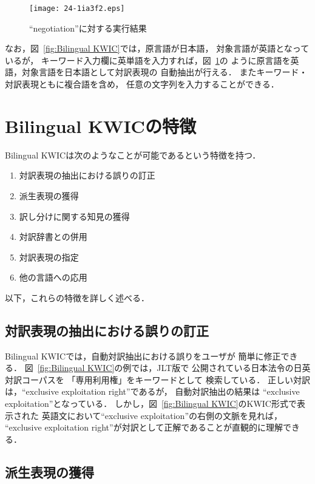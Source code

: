 \documentclass[japanese]{jnlp_1.4}
\begin{document}
\begin{figure}[t]
\begin{center}
\texttt{[image: 24-1ia3f2.eps]}
\end{center}
\caption{``negotiation''に対する実行結果}
\label{fig:Bilingual KWIC 2}
\vspace{-0.5\Cvs}
\end{figure}

なお，図~\ref{fig:Bilingual KWIC}では，原言語が日本語，
対象言語が英語となっているが，
キーワード入力欄に英単語を入力すれば，図~\ref{fig:Bilingual KWIC 2}の
ように原言語を英語，対象言語を日本語として対訳表現の
自動抽出が行える．
またキーワード・対訳表現ともに複合語を含め，
任意の文字列を入力することができる．

\clearpage

\section{Bilingual KWICの特徴}
\label{sec:character}

Bilingual KWICは次のようなことが可能であるという特徴を持つ．
\begin{enumerate}
 \item 対訳表現の抽出における誤りの訂正
 \item 派生表現の獲得
 \item 訳し分けに関する知見の獲得
 \item 対訳辞書との併用
 \item 対訳表現の指定
 \item 他の言語への応用
\end{enumerate}

以下，これらの特徴を詳しく述べる．


\subsection{対訳表現の抽出における誤りの訂正}

Bilingual KWICでは，自動対訳抽出における誤りをユーザが
簡単に修正できる．
図~\ref{fig:Bilingual KWIC}の例では，JLT版で
公開されている日本法令の日英対訳コーパスを
「専用利用権」をキーワードとして
検索している．
正しい対訳は，``exclusive exploitation right''であるが，
自動対訳抽出の結果は
``exclusive exploitation''となっている．
しかし，図~\ref{fig:Bilingual KWIC}のKWIC形式で表示された
英語文において``exclusive exploitation''の右側の文脈を見れば，
``exclusive exploitation right''が対訳として正解であることが直観的に理解できる．


\subsection{派生表現の獲得}
\end{document}
